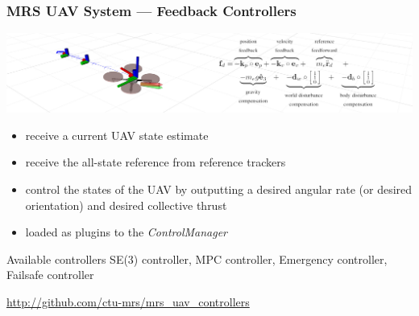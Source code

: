 \documentclass[aspectratio=1610]{beamer}
\begin{document}
  \begin{frame}
    \frametitle{MRS UAV System --- Feedback Controllers}

    \vspace{-0.33em}

    \includegraphics[width=1.0\textwidth]{./fig/thumbnail_controllers.jpg}

    \vspace{-0.6em}

    \begin{itemize}
      \item receive a current UAV state estimate
      \item receive the all-state reference from reference trackers
      \item control the states of the UAV by outputting a desired angular rate (or desired orientation) and desired collective thrust
      \item loaded as plugins to the \emph{ControlManager}
    \end{itemize}

    \begin{block}{Available controllers}
      SE(3) controller, MPC controller, Emergency controller, Failsafe controller
    \end{block}

    \begin{block}{\cite{baca2020mrs}}
      \url{http://github.com/ctu-mrs/mrs_uav_controllers}
    \end{block}

  \end{frame}


\end{document}
